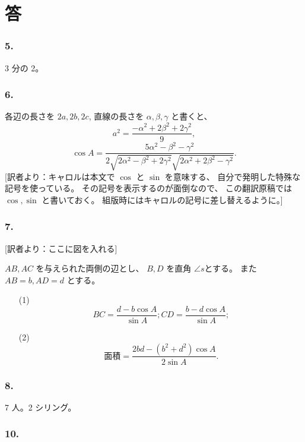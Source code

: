 \chapter{答}

\subsection*{5.}

3 分の 2。

\subsection*{6.}

各辺の長さを $2a, 2b, 2c$, 直線の長さを $\alpha, \beta, \gamma$
と書くと、
\[
a^2 = \frac{-\alpha^2 + 2 \beta^2 + 2 \gamma^2}{9},
\]
\[
\cos A =
\frac{5 \alpha^2 - \beta^2 -\gamma^2}{2 \sqrt{2 \alpha^2 - \beta^2 + 2 \gamma^2} \sqrt{2 \alpha^2 + 2 \beta^2 - \gamma^2}}.
\]
[訳者より：キャロルは本文で $\cos$ と $\sin$ を意味する、
自分で発明した特殊な記号を使っている。
その記号を表示するのが面倒なので、
この翻訳原稿では$\cos, \sin$ と書いておく。
組版時にはキャロルの記号に差し替えるように。]

\subsection*{7.}

[訳者より：ここに図を入れる]

$AB, AC$ を与えられた両側の辺とし、
$B, D$ を直角 $\angle s$とする。
また $AB = b, AD = d$ とする。
\begin{enumerate}
\item[(1)]
\[
BC = \frac{d - b \cos A}{\sin A};
CD = \frac{b - d \cos A}{\sin A};
\]
\item[(2)]
\[
\mbox{面積} = \frac{2bd - (b^2 + d^2) \cos A}{2 \sin A}.
\]
\end{enumerate}

\subsection*{8.}

7 人。2 シリング。

\subsection*{10.}

